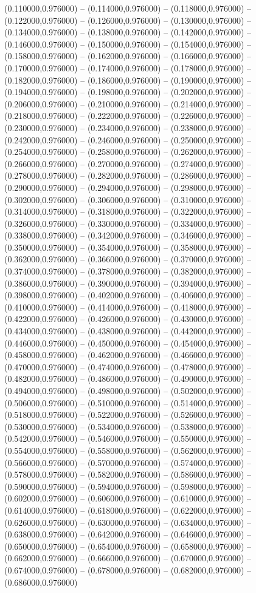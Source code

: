    (0.110000,0.976000) -- (0.114000,0.976000) -- (0.118000,0.976000) -- (0.122000,0.976000) -- (0.126000,0.976000) -- (0.130000,0.976000) -- (0.134000,0.976000) -- (0.138000,0.976000) -- (0.142000,0.976000) -- (0.146000,0.976000) -- (0.150000,0.976000) -- (0.154000,0.976000) -- (0.158000,0.976000) -- (0.162000,0.976000) -- (0.166000,0.976000) -- (0.170000,0.976000) -- (0.174000,0.976000) -- (0.178000,0.976000) -- (0.182000,0.976000) -- (0.186000,0.976000) -- (0.190000,0.976000) -- (0.194000,0.976000) -- (0.198000,0.976000) -- (0.202000,0.976000) -- (0.206000,0.976000) -- (0.210000,0.976000) -- (0.214000,0.976000) -- (0.218000,0.976000) -- (0.222000,0.976000) -- (0.226000,0.976000) -- (0.230000,0.976000) -- (0.234000,0.976000) -- (0.238000,0.976000) -- (0.242000,0.976000) -- (0.246000,0.976000) -- (0.250000,0.976000) -- (0.254000,0.976000) -- (0.258000,0.976000) -- (0.262000,0.976000) -- (0.266000,0.976000) -- (0.270000,0.976000) -- (0.274000,0.976000) -- (0.278000,0.976000) -- (0.282000,0.976000) -- (0.286000,0.976000) -- (0.290000,0.976000) -- (0.294000,0.976000) -- (0.298000,0.976000) -- (0.302000,0.976000) -- (0.306000,0.976000) -- (0.310000,0.976000) -- (0.314000,0.976000) -- (0.318000,0.976000) -- (0.322000,0.976000) -- (0.326000,0.976000) -- (0.330000,0.976000) -- (0.334000,0.976000) -- (0.338000,0.976000) -- (0.342000,0.976000) -- (0.346000,0.976000) -- (0.350000,0.976000) -- (0.354000,0.976000) -- (0.358000,0.976000) -- (0.362000,0.976000) -- (0.366000,0.976000) -- (0.370000,0.976000) -- (0.374000,0.976000) -- (0.378000,0.976000) -- (0.382000,0.976000) -- (0.386000,0.976000) -- (0.390000,0.976000) -- (0.394000,0.976000) -- (0.398000,0.976000) -- (0.402000,0.976000) -- (0.406000,0.976000) -- (0.410000,0.976000) -- (0.414000,0.976000) -- (0.418000,0.976000) -- (0.422000,0.976000) -- (0.426000,0.976000) -- (0.430000,0.976000) -- (0.434000,0.976000) -- (0.438000,0.976000) -- (0.442000,0.976000) -- (0.446000,0.976000) -- (0.450000,0.976000) -- (0.454000,0.976000) -- (0.458000,0.976000) -- (0.462000,0.976000) -- (0.466000,0.976000) -- (0.470000,0.976000) -- (0.474000,0.976000) -- (0.478000,0.976000) -- (0.482000,0.976000) -- (0.486000,0.976000) -- (0.490000,0.976000) -- (0.494000,0.976000) -- (0.498000,0.976000) -- (0.502000,0.976000) -- (0.506000,0.976000) -- (0.510000,0.976000) -- (0.514000,0.976000) -- (0.518000,0.976000) -- (0.522000,0.976000) -- (0.526000,0.976000) -- (0.530000,0.976000) -- (0.534000,0.976000) -- (0.538000,0.976000) -- (0.542000,0.976000) -- (0.546000,0.976000) -- (0.550000,0.976000) -- (0.554000,0.976000) -- (0.558000,0.976000) -- (0.562000,0.976000) -- (0.566000,0.976000) -- (0.570000,0.976000) -- (0.574000,0.976000) -- (0.578000,0.976000) -- (0.582000,0.976000) -- (0.586000,0.976000) -- (0.590000,0.976000) -- (0.594000,0.976000) -- (0.598000,0.976000) -- (0.602000,0.976000) -- (0.606000,0.976000) -- (0.610000,0.976000) -- (0.614000,0.976000) -- (0.618000,0.976000) -- (0.622000,0.976000) -- (0.626000,0.976000) -- (0.630000,0.976000) -- (0.634000,0.976000) -- (0.638000,0.976000) -- (0.642000,0.976000) -- (0.646000,0.976000) -- (0.650000,0.976000) -- (0.654000,0.976000) -- (0.658000,0.976000) -- (0.662000,0.976000) -- (0.666000,0.976000) -- (0.670000,0.976000) -- (0.674000,0.976000) -- (0.678000,0.976000) -- (0.682000,0.976000) -- (0.686000,0.976000) 
